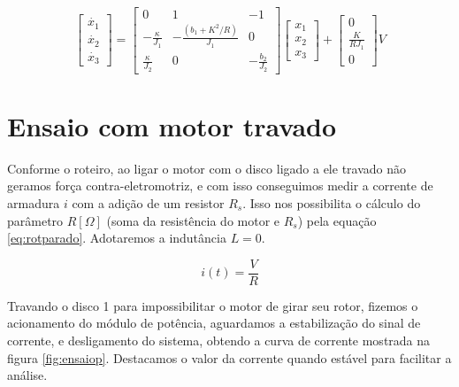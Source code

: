 \documentclass{article}
\begin{document}
\begin{equation}
\label{eq:ss}
\left[ \begin{array}{c}
\dot{x_1} \\
\dot{x_2} \\
\dot{x_3} \end{array} \right]
=
\left[ \begin{array}{ccc}
0 & 1 & -1 \\
-\frac{\kappa}{J_1} & -\frac{(b_1+K^2/R)}{J_1} & 0 \\
\frac{\kappa}{J_2} & 0 & -\frac{b_2}{J_2} \end{array} \right]
\left[ \begin{array}{c}
x_1 \\
x_2 \\
x_3  \end{array} \right]
+
\left[ \begin{array}{c}
0 				\\
\frac{K}{RJ_1} 	\\
0				\end{array} \right]
V
\end{equation}

\section{Ensaio com motor travado}
Conforme o roteiro\cite{bb:roteiro}, ao ligar o motor com o disco ligado a ele travado não geramos força contra-eletromotriz, e com isso conseguimos medir a corrente de armadura $i$ com a adição de um resistor $R_s$. Isso nos possibilita o cálculo do parâmetro $R [\Omega]$ (soma da resistência do motor e $R_s$) pela equação \ref{eq:rotparado}. Adotaremos a indutância $L=0$.

\begin{equation}
\label{eq:rotparado}
i(t) = \frac{V}{R}
\end{equation}

Travando o disco 1 para impossibilitar o motor de girar seu rotor, fizemos o acionamento do módulo de potência, aguardamos a estabilização do sinal de corrente, e desligamento do sistema, obtendo a curva de corrente mostrada na figura \ref{fig:ensaiop}. Destacamos o valor da corrente quando estável para facilitar a análise.
\end{document}
